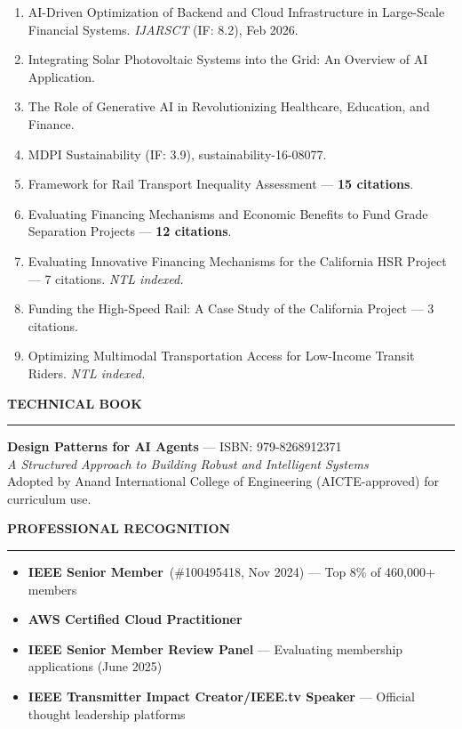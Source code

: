 \documentclass[11pt]{article}
\newcommand{\sect}[1]{%
  \vspace{10pt}%
  {\color{sectioncolor}\large\bfseries\MakeUppercase{#1}}\\[-6pt]%
  {\color{rulecolor}\rule{\textwidth}{1.2pt}}%
  \vspace{4pt}%
}
\begin{document}
\begin{enumerate}
\setlength{\itemsep}{2pt}\setlength{\parsep}{0pt}\setlength{\topsep}{3pt}
    \item AI-Driven Optimization of Backend and Cloud Infrastructure in Large-Scale Financial Systems. \textit{IJARSCT} (IF: 8.2), Feb 2026.
    \item Integrating Solar Photovoltaic Systems into the Grid: An Overview of AI Application.
    \item The Role of Generative AI in Revolutionizing Healthcare, Education, and Finance.
    \item MDPI Sustainability (IF: 3.9), sustainability-16-08077.
    \item Framework for Rail Transport Inequality Assessment --- \textbf{15 citations}.
    \item Evaluating Financing Mechanisms and Economic Benefits to Fund Grade Separation Projects --- \textbf{12 citations}.
    \item Evaluating Innovative Financing Mechanisms for the California HSR Project --- 7 citations. \textit{NTL indexed.}
    \item Funding the High-Speed Rail: A Case Study of the California Project --- 3 citations.
    \item Optimizing Multimodal Transportation Access for Low-Income Transit Riders. \textit{NTL indexed.}
\end{enumerate}

\sect{Technical Book}

\textbf{Design Patterns for AI Agents} --- ISBN: 979-8268912371\\
\textit{A Structured Approach to Building Robust and Intelligent Systems}\\
Adopted by Anand International College of Engineering (AICTE-approved) for curriculum use.

\sect{Professional Recognition}

\begin{itemize}
\setlength{\itemsep}{2pt}\setlength{\parsep}{0pt}\setlength{\topsep}{3pt}
    \item \textbf{IEEE Senior Member}\ (\#100495418, Nov 2024) --- Top 8\% of 460,000+ members
    \item \textbf{AWS Certified Cloud Practitioner}
    \item \textbf{IEEE Senior Member Review Panel} --- Evaluating membership applications (June 2025)
    \item \textbf{IEEE Transmitter Impact Creator\;/\;IEEE.tv Speaker} --- Official thought leadership platforms
\end{itemize}
\end{document}
